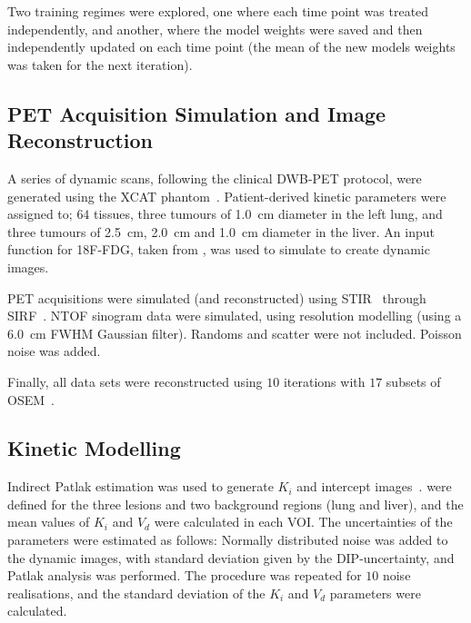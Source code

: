         Two training regimes were explored, one where each time point was treated independently, and another, where the model weights were saved and then independently updated on each time point (the mean of the new models weights was taken for the next iteration).
        
    \vspace{-0.4cm}
    
    \subsection{\acrshort{PET} Acquisition Simulation and Image Reconstruction} \label{sec:pet_acquisition_simulation_and_image_reconstruction}
        A series of dynamic scans, following the clinical \acrlong{DWB}-\acrshort{PET} protocol, were generated using the \acrshort{XCAT} phantom~\cite{segars4DXCATPhantom2010}. Patient-derived kinetic parameters were assigned to; $64$ tissues, three tumours of \SI{1.0}{\centi\meter} diameter in the left lung, and three tumours of \SI{2.5}{\centi\meter}, \SI{2.0}{\centi\meter} and \SI{1.0}{\centi\meter} diameter in the liver. An input function for \acrshort{18F-FDG}, taken from \cite{langsjoEffectsSubanestheticKetamine2004}, was used to simulate  to create dynamic images.

        \acrshort{PET} acquisitions were simulated (and reconstructed) using \acrshort{STIR}~\cite{Thielemans2012} through \acrshort{SIRF}~\cite{Ovtchinnikov2017}. \acrlong{NTOF} sinogram data were simulated, using resolution modelling (using a \SI{6.0}{\centi\meter} \acrshort{FWHM} Gaussian filter). Randoms and scatter were not included. Poisson noise was added.%

        Finally, all data sets were reconstructed using $10$ iterations with $17$ subsets of \acrshort{OSEM}~\cite{Hudson1994}.

    \vspace{-0.4cm}
    
    \subsection{Kinetic Modelling} \label{sec:kinetic_modelling}
        Indirect Patlak estimation was used to generate $K_i$ and intercept images~\cite{patlak1983GraphicalEvaluationBloodtoBrain}.  were defined for the three lesions and two background regions (lung and liver), and the mean values of $K_i$ and $V_d$ were calculated in each \gls{VOI}. The uncertainties of the parameters were estimated as follows: Normally distributed noise was added to the dynamic images, with standard deviation given by the \gls{DIP}-uncertainty, and Patlak analysis was performed. The procedure was repeated for $10$ noise realisations, and the standard deviation of the $K_i$ and $V_d$ parameters were calculated.
        
